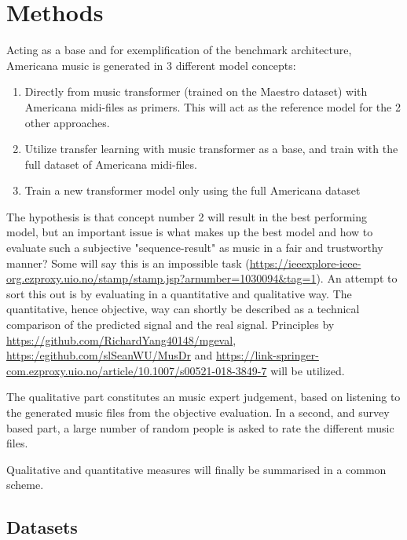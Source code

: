 \documentclass{article}
\begin{document}
    \section{Methods}

        Acting as a base and for exemplification of the benchmark architecture,
        Americana music is generated in 3 different model concepts:
        \begin{enumerate}
            \item Directly from music transformer (trained on the Maestro dataset)
                    with Americana midi-files as primers.
                    This will act as the reference model for the 2 other approaches.
            \item Utilize transfer learning with music transformer as a base, and
                    train with the full dataset of Americana midi-files.
            \item Train a new transformer model only using the full Americana dataset
        \end{enumerate} 
        
        The hypothesis is that concept number 2 will result in the best performing model,
        but an important issue is what makes up the best model and how to evaluate such a
        subjective "sequence-result" as music in a fair and trustworthy manner?
        Some will say this is an impossible task
        (\url{https://ieeexplore-ieee-org.ezproxy.uio.no/stamp/stamp.jsp?arnumber=1030094&tag=1}).
        An attempt to sort this out is by evaluating in a quantitative and qualitative way.
        The quantitative, hence objective, way can shortly be described as a technical
        comparison of the predicted signal and the real signal. Principles by
        \url{https://github.com/RichardYang40148/mgeval}, \url{https:/egithub.com/slSeanWU/MusDr} and
        \url{https://link-springer-com.ezproxy.uio.no/article/10.1007/s00521-018-3849-7} will be utilized.
        
        The qualitative part constitutes an music expert judgement,
        based on listening to the generated music files from the objective evaluation.
        In a second, and survey based part, a large number of random people is asked
        to rate the different music files.
        
        Qualitative and quantitative measures will finally be summarised in a common scheme.
        
    \subsection{Datasets}
\end{document}
